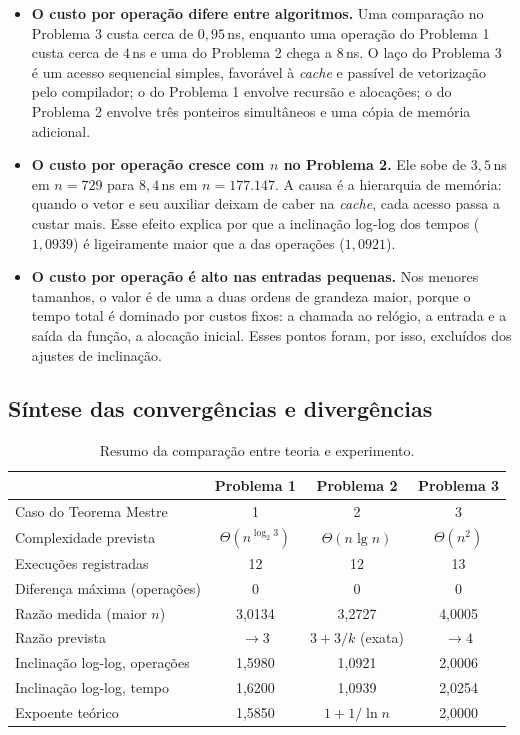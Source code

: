 \documentclass[11pt,a4paper]{article}
\begin{document}
\begin{itemize}[itemsep=2pt]
  \item \textbf{O custo por operação difere entre algoritmos.} Uma comparação no Problema 3 custa cerca de $0{,}95$\,ns, enquanto uma operação do Problema 1 custa cerca de $4$\,ns e uma do Problema 2 chega a $8$\,ns. O laço do Problema 3 é um acesso sequencial simples, favorável à \emph{cache} e passível de vetorização pelo compilador; o do Problema 1 envolve recursão e alocações; o do Problema 2 envolve três ponteiros simultâneos e uma cópia de memória adicional.
  \item \textbf{O custo por operação cresce com $n$ no Problema 2.} Ele sobe de $3{,}5$\,ns em $n=729$ para $8{,}4$\,ns em $n=177.147$. A causa é a hierarquia de memória: quando o vetor e seu auxiliar deixam de caber na \emph{cache}, cada acesso passa a custar mais. Esse efeito explica por que a inclinação log-log dos tempos ($1{,}0939$) é ligeiramente maior que a das operações ($1{,}0921$).
  \item \textbf{O custo por operação é alto nas entradas pequenas.} Nos menores tamanhos, o valor é de uma a duas ordens de grandeza maior, porque o tempo total é dominado por custos fixos: a chamada ao relógio, a entrada e a saída da função, a alocação inicial. Esses pontos foram, por isso, excluídos dos ajustes de inclinação.
\end{itemize}

\subsection{Síntese das convergências e divergências}

\begin{table}[H]
\centering
\caption{Resumo da comparação entre teoria e experimento.}
\label{tab:sintese}
\small
\begin{tabular}{lccc}
\toprule
 & Problema 1 & Problema 2 & Problema 3 \\
\midrule
Caso do Teorema Mestre & 1 & 2 & 3 \\
Complexidade prevista & $\Theta(n^{\log_2 3})$ & $\Theta(n\lg n)$ & $\Theta(n^2)$ \\
Execuções registradas & 12 & 12 & 13 \\
Diferença máxima (operações) & 0 & 0 & 0 \\
Razão medida (maior $n$) & 3,0134 & 3,2727 & 4,0005 \\
Razão prevista & $\to3$ & $3+3/k$ (exata) & $\to4$ \\
Inclinação log-log, operações & 1,5980 & 1,0921 & 2,0006 \\
Inclinação log-log, tempo & 1,6200 & 1,0939 & 2,0254 \\
Expoente teórico & 1,5850 & $1+1/\ln n$ & 2,0000 \\
\bottomrule
\end{tabular}
\end{table}
\end{document}
